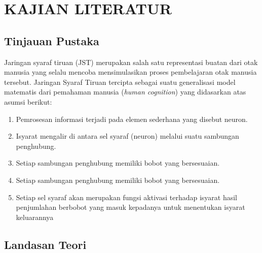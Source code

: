 
\chapter{KAJIAN LITERATUR}                

\section{Tinjauan Pustaka}
 Jaringan syaraf tiruan (JST) merupakan salah satu representasi buatan dari otak manusia yang selalu mencoba mensimulasikan proses pembelajaran otak manusia tersebut. Jaringan Syaraf Tiruan tercipta sebagai suatu generalisasi model matematis dari pemahaman manusia (\emph{human cognition}) yang didasarkan atas asumsi berikut:
 \begin{enumerate}
 	\item Pemrosesan informasi terjadi pada elemen sederhana yang disebut neuron.
 	\item Isyarat mengalir di antara sel syaraf (neuron) melalui suatu sambungan penghubung.
 	\item Setiap sambungan penghubung memiliki bobot yang bersesuaian.
 	\item Setiap sambungan penghubung memiliki bobot yang bersesuaian.
 	\item Setiap sel syaraf akan merupakan fungsi aktivasi terhadap isyarat hasil penjumlahan
 	berbobot yang masuk kepadanya untuk menentukan isyarat keluarannya \cite{ZeksonArizonaMatondang}
 \end{enumerate}

\section{Landasan Teori}
